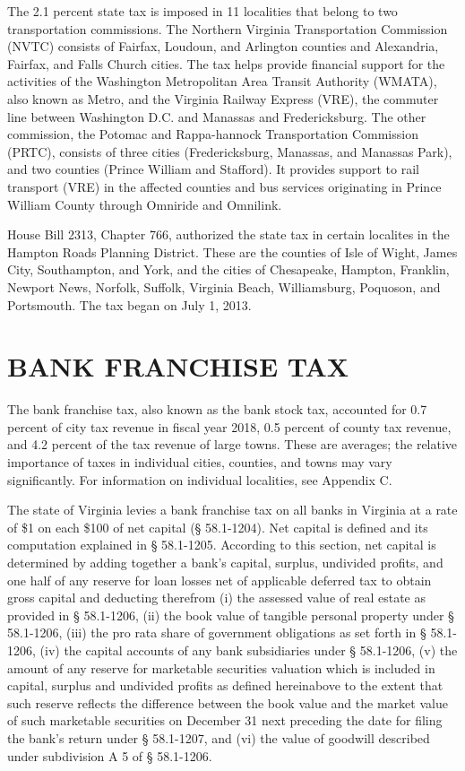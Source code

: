 \documentclass[
]{book}
\begin{document}
The 2.1 percent state tax is imposed in 11 localities that belong to two transportation commissions. The Northern Virginia Transportation Commission (NVTC) consists of Fairfax, Loudoun, and Arlington counties and Alexandria, Fairfax, and Falls Church cities. The tax helps provide financial support for the activities of the Washington Metropolitan Area Transit Authority (WMATA), also known as Metro, and the Virginia Railway Express (VRE), the commuter line between Washington D.C. and Manassas and Fredericksburg. The other commission, the Potomac and Rappa-hannock Transportation Commission (PRTC), consists of three cities (Fredericksburg, Manassas, and Manassas Park), and two counties (Prince William and Stafford). It provides support to rail transport (VRE) in the affected counties and bus services originating in Prince William County through Omniride and Omnilink.

House Bill 2313, Chapter 766, authorized the state tax in certain localites in the Hampton Roads Planning District. These are the counties of Isle of Wight, James City, Southampton, and York, and the cities of Chesapeake, Hampton, Franklin, Newport News, Norfolk, Suffolk, Virginia Beach, Williamsburg, Poquoson, and Portsmouth. The tax began on July 1, 2013.

\hypertarget{bank-franchise-tax}{%
\section{BANK FRANCHISE TAX}\label{bank-franchise-tax}}

The bank franchise tax, also known as the bank stock tax, accounted for 0.7 percent of city tax revenue in fiscal year 2018, 0.5 percent of county tax revenue, and 4.2 percent of the tax revenue of large towns. These are averages; the relative importance of taxes in individual cities, counties, and towns may vary significantly. For information on individual localities, see Appendix C.

The state of Virginia levies a bank franchise tax on all banks in Virginia at a rate of \$1 on each \$100 of net capital (§ 58.1-1204). Net capital is defined and its computation explained in § 58.1-1205. According to this section, net capital is determined by adding together a bank's capital, surplus, undivided profits, and one half of any reserve for loan losses net of applicable deferred tax to obtain gross capital and deducting therefrom (i) the assessed value of real estate as provided in § 58.1-1206, (ii) the book value of tangible personal property under § 58.1-1206, (iii) the pro rata share of government obligations as set forth in § 58.1-1206, (iv) the capital accounts of any bank subsidiaries under § 58.1-1206, (v) the amount of any reserve for marketable securities valuation which is included in capital, surplus and undivided profits as defined hereinabove to the extent that such reserve reflects the difference between the book value and the market value of such marketable securities on December 31 next preceding the date for filing the bank's return under § 58.1-1207, and (vi) the value of goodwill described under subdivision A 5 of § 58.1-1206.
\end{document}
